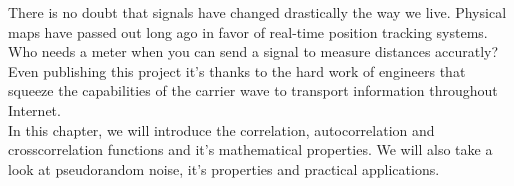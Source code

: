 There is no doubt that signals have changed drastically the way we live.
Physical maps have passed out long ago in favor of real-time position tracking
systems. Who needs a meter when you can send a signal to measure distances
accuratly? Even publishing this project it's thanks to the hard work of
engineers that squeeze the capabilities of the carrier wave to transport
information throughout Internet. \\

In this chapter, we will introduce the correlation, autocorrelation and
crosscorrelation functions and it's mathematical properties. We will also take
a look at pseudorandom noise, it's properties and practical applications.


